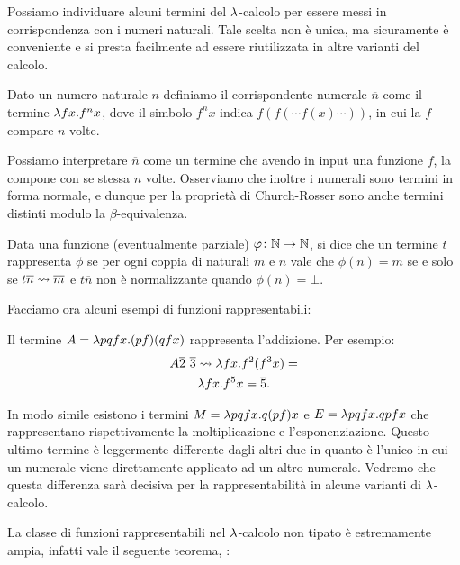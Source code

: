 \documentclass[]{marticle}
\begin{document}
Possiamo individuare alcuni termini del $\lambda$-calcolo per essere messi in
corrispondenza con i numeri naturali. Tale scelta non \`e unica, ma sicuramente
\`e conveniente e si presta facilmente ad essere riutilizzata in altre varianti
del calcolo.

\begin{block}[Definizione]
    Dato un numero naturale $n$ definiamo il corrispondente numerale
    $\overline{n}$ come il termine $\lambda f x. f^n x$, dove il simbolo $f^n x$
    indica $f(f(\cdots f(x) \cdots))$, in cui la $f$ compare $n$ volte.
\end{block}

Possiamo interpretare $\overline{n}$ come un termine che avendo in input una
funzione $f$, la compone con se stessa $n$ volte. Osserviamo che inoltre i
numerali sono termini in forma normale, e dunque per la propriet\`a di
Church-Rosser sono anche termini distinti modulo la $\beta$-equivalenza.

\begin{block}[Definizione]
    Data una funzione (eventualmente parziale) $\varphi\colon \mathbb{N} \rightarrow \mathbb{N}$,
    si dice che un termine $t$ rappresenta $\phi$ se per ogni coppia di naturali
    $m$ e $n$ vale che $\phi(n)=m$ se e solo se $t\overline{n}\rightsquigarrow\overline{m}$
    e $t\overline{n}$ non \`e normalizzante quando $\phi(n)=\bot$.
\end{block}

Facciamo ora alcuni esempi di funzioni rappresentabili:
\begin{block}[Esempio]
    Il termine $A = \lambda pq fx. (pf)(qfx)$ rappresenta l'addizione. Per esempio:
    \begin{gather*}
        A\overline{2}\ \overline{3} \rightsquigarrow \lambda fx. f^2 (f^3 x) = \\
        \lambda fx. f^5 x = \overline{5}.
    \end{gather*}


    In modo simile esistono i termini $M = \lambda p q f x. q (p f) x$ e $E = \lambda p q
    f x. qpfx$ che rappresentano rispettivamente la moltiplicazione e
    l'esponenziazione. Questo ultimo termine \`e leggermente differente dagli
    altri due in quanto \`e l'unico in cui un numerale viene direttamente
    applicato ad un altro numerale. Vedremo che questa differenza sar\`a
    decisiva per la rappresentabilit\`a in alcune varianti di $\lambda$-calcolo.
\end{block}

La classe di funzioni rappresentabili nel $\lambda$-calcolo non tipato \`e
estremamente ampia, infatti vale il seguente teorema, :
\end{document}
